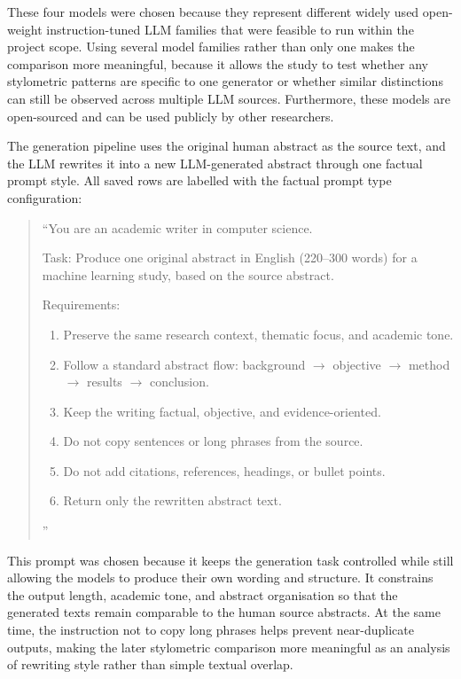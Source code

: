 \documentclass[12pt,a4paper]{article}
\begin{document}
These four models were chosen because they represent different widely used open-weight instruction-tuned LLM families that were feasible to run within the project scope. Using several model families rather than only one makes the comparison more meaningful, because it allows the study to test whether any stylometric patterns are specific to one generator or whether similar distinctions can still be observed across multiple LLM sources. Furthermore, these models are open-sourced and can be used publicly by other researchers.

The generation pipeline uses the original human abstract as the source text, and the LLM rewrites it into a new LLM-generated abstract through one factual prompt style. All saved rows are labelled with the factual prompt type configuration:

\begin{quote}
``You are an academic writer in computer science.

Task:
Produce one original abstract in English (220--300 words) for a machine learning study, based on the source abstract.

Requirements:
\begin{enumerate}[label=\arabic*., leftmargin=2em]
    \item Preserve the same research context, thematic focus, and academic tone.
    \item Follow a standard abstract flow: background $\rightarrow$ objective $\rightarrow$ method $\rightarrow$ results $\rightarrow$ conclusion.
    \item Keep the writing factual, objective, and evidence-oriented.
    \item Do not copy sentences or long phrases from the source.
    \item Do not add citations, references, headings, or bullet points.
    \item Return only the rewritten abstract text.
\end{enumerate}
'' 
\end{quote}

This prompt was chosen because it keeps the generation task controlled while still allowing the models to produce their own wording and structure. It constrains the output length, academic tone, and abstract organisation so that the generated texts remain comparable to the human source abstracts. At the same time, the instruction not to copy long phrases helps prevent near-duplicate outputs, making the later stylometric comparison more meaningful as an analysis of rewriting style rather than simple textual overlap.
\end{document}
